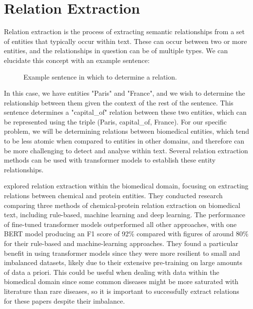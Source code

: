\documentclass{l4proj}
\begin{document}
\section{Relation Extraction}
Relation extraction is the process of extracting semantic relationships from a set of entities that typically occur within text. These can occur between two or more entities, and the relationships in question can be of multiple types. We can elucidate this concept with an example sentence:

\begin{figure}[h]
    \centering
  \caption{Example sentence in which to determine a relation.}
  \label{fig:Tagging}
\end{figure}


In this case, we have entities "Paris" and "France", and we wish to determine the relationship between them given the context of the rest of the sentence. This sentence determines a "capital\_of" relation between these two entities, which can be represented using the triple (Paris, capital\_of, France). For our specific problem, we will be determining relations between biomedical entities, which tend to be less atomic when compared to entities in other domains, and therefore can be more challenging to detect and analyse within text. Several relation extraction methods can be used with transformer models to establish these entity relationships.

\cite{comparison} explored relation extraction within the biomedical domain, focusing on extracting relations between chemical and protein entities. They conducted research comparing three methods of chemical-protein relation extraction on biomedical text, including rule-based, machine learning and deep learning. The performance of fine-tuned transformer models outperformed all other approaches, with one BERT model producing an F1 score of 92\% compared with figures of around 80\% for their rule-based and machine-learning approaches. They found a particular benefit in using transformer models since they were more resilient to small and imbalanced datasets, likely due to their extensive pre-training on large amounts of data a priori. This could be useful when dealing with data within the biomedical domain since some common diseases might be more saturated with literature than rare diseases, so it is important to successfully extract relations for these papers despite their imbalance.
\end{document}
